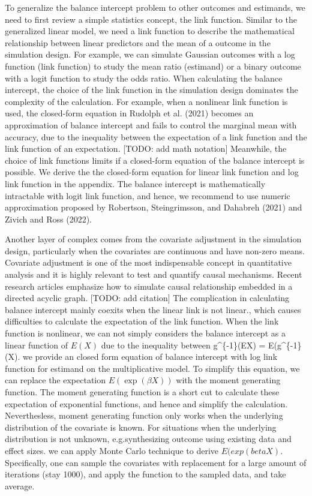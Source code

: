 \documentclass[
]{article}
\begin{document}
To generalize the balance intercept problem to other outcomes and
estimands, we need to first review a simple statistics concept, the link
function. Similar to the generalized linear model, we need a link
function to describe the mathematical relationship between linear
predictors and the mean of a outcome in the simulation design. For
example, we can simulate Gaussian outcomes with a log function (link
function) to study the mean ratio (estimand) or a binary outcome with a
logit function to study the odds ratio. When calculating the balance
intercept, the choice of the link function in the simulation design
dominates the complexity of the calculation. For example, when a
nonlinear link function is used, the closed-form equation in Rudolph et
al. (2021) becomes an approximation of balance intercept and fails to
control the marginal mean with accuracy, due to the inequality between
the expectation of a link function and the link function of an
expectation. {[}TODO: add math notation{]} Meanwhile, the choice of link
functions limits if a closed-form equation of the balance intercept is
possible. We derive the the closed-form equation for linear link
function and log link function in the appendix. The balance intercept is
mathematically intractable with logit link function, and hence, we
recommend to use numeric approximation proposed by Robertson,
Steingrimsson, and Dahabreh (2021) and Zivich and Ross (2022).

Another layer of complex comes from the covariate adjustment in the
simulation design, particularly when the covariates are continuous and
have non-zero means. Covariate adjustment is one of the most
indispensable concept in quantitative analysis and it is highly relevant
to test and quantify causal mechanisms. Recent research articles
emphasize how to simulate causal relationship embedded in a directed
acyclic graph. {[}TODO: add citation{]} The complication in calculating
balance intercept mainly coexits when the linear link is not linear.,
which causes difficulties to calculate the expectation of the link
function. When the link function is nonlinear, we can not simply
considers the balance intercept as a linear function of \(E(X)\) due to
the inequality between g\^{}\{-1\}(EX) = E(g\^{}\{-1\}(X). we provide an
closed form equation of balance intercept with log link function for
estimand on the multiplicative model. To simplify this equation, we can
replace the expectation \(E(\exp(\beta X))\) with the moment generating
function. The moment generating function is a short cut to calculate
these expectation of exponential functions, and hence and simplify the
calculation. Neverthesless, moment generating function only works when
the underlying distribution of the covariate is known. For situations
when the underlying distribution is not unknown, e.g.synthesizing
outcome using existing data and effect sizes. we can apply Monte Carlo
technique to derive \(E(exp(betaX)\). Specifically, one can sample the
covariates with replacement for a large amount of iterations (stay
1000), and apply the function to the sampled data, and take average.
\end{document}
